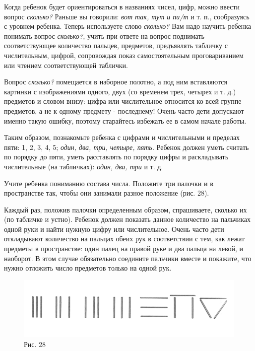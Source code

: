 \documentclass{book}
\renewcommand{\emph}[1]{\textit{#1}}
\begin{document}
Когда ребенок будет ориентироваться в названиях чисел, цифр, можно
ввести вопрос \emph{сколько?} Раньше вы говорили: \emph{вот так, тут и
пи/т} и т. п., сообразуясь с уровнем ребенка. Теперь используете слово
\emph{сколько?} Вам надо научить ребенка понимать вопрос
\emph{сколько?,} учить при ответе на вопрос поднимать соответствующее
количество пальцев, предметов, предъявлять табличку с числительным,
цифрой, сопровождая показ самостоятельным проговариванием или чтением
соответствующей таблички.

Вопрос \emph{сколько?} помещается в наборное полотно, а под ним
вставляются картинки с изображениями одного, двух (со временем трех,
четырех и т. д.) предметов и словом внизу: цифра или числительное
относится ко всей группе предметов, а не к одному предмету - последнему!
Очень часто дети допускают именно такую ошибку, поэтому старайтесь
избежать ее в самом начале работы.

Таким образом, познакомьте ребенка с цифрами и числительными и пределах
пяти: 1, 2, 3, 4, 5; \emph{один, два, три, четыре, пять.} Ребенок должен
уметь считать по порядку до пяти, уметь расставлять по порядку цифры и
раскладывать числительные (на табличках): \emph{один, два, три} и т. д.

Учите ребенка пониманию состава числа. Положите три палочки и в
пространстве так, чтобы они занимали разное положение (рис. 28).

Каждый раз, положив палочки определенным образом, спрашиваете, сколько
их (по табличке и устно). Ребенок должен показать данное количество на
пальчиках одной руки и найти нужную цифру или числительное. Очень часто
дети откладывают количество на пальцах обеих рук в соответствии с тем,
как лежат предметы в пространстве: один палец на правой руке и два
пальца на левой, и наоборот. В этом случае обязательно соедините
пальчики вместе и покажите, что нужно отложить число предметов только на
одной рук.

\begin{figure}
\centering
\includegraphics[width=\linewidth]{media/media/image25.png}
\caption*{Рис. 28}
\end{figure}
\end{document}

